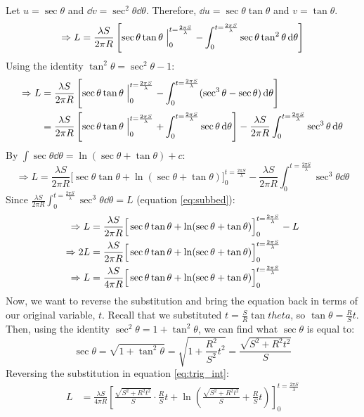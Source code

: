 \bulletarrow Let $u=\sec{\theta}$ and $\dd{v} = \sec^2{\theta} \dd{\theta}$. Therefore, $\dd{u} = \sec{\theta}\tan{\theta}$ and $v = \tan{\theta}$.
\begin{equation*}
    \Rightarrow L = \frac{\lambda S}{2\pi R}\left[\sec{\theta}\tan{\theta}\Bigm|_0^{t =\frac{2\pi S}{\lambda}}-\int_0^{t =\frac{2\pi S}{\lambda}} \sec{\theta}\tan^2{\theta} \dd{\theta}
    \right]
\end{equation*}
\bulletarrow Using the identity $\tan^2{\theta} = \sec^2{\theta} - 1$:
\begin{align*}
    \Rightarrow L & = \frac{\lambda S}{2\pi R}\left[\sec{\theta}\tan{\theta}\Bigm|_0^{t =\frac{2\pi S}{\lambda}}-\int_0^{t =\frac{2\pi S}{\lambda}} (\sec^3{\theta} - \sec{\theta}) \dd{\theta}\right]                                                                      \\
                  & = \frac{\lambda S}{2\pi R}\left[\sec{\theta}\tan{\theta}\Bigm|_0^{t =\frac{2\pi S}{\lambda}}+\int_0^{t =\frac{2\pi S}{\lambda}}  \sec{\theta} \dd{\theta}\right] - \frac{\lambda S}{2\pi R}\int_0^{t =\frac{2\pi S}{\lambda}}\sec^3{\theta} \dd{\theta}
\end{align*}
\bulletarrow By $\int \sec{\theta} \dd{\theta} = \ln(\sec{\theta}+\tan{\theta})+c$:
\begin{equation*}
    \Rightarrow L = \frac{\lambda S}{2\pi R}\Big[\sec{\theta}\tan{\theta}+\ln(\sec{\theta}+\tan{\theta})\Big]_0^{t =\frac{2\pi S}{\lambda}} - \frac{\lambda S}{2\pi R}\int_0^{t =\frac{2\pi S}{\lambda}}\sec^3{\theta} \dd{\theta}
\end{equation*}
\bulletarrow Since $\frac{\lambda S}{2\pi R}\int_0^{t =\frac{2\pi S}{\lambda}}\sec^3{\theta} \dd{\theta} = L$ (equation \ref{eq:subbed}):
\begin{align}
    \Rightarrow L  & = \frac{\lambda S}{2\pi R}\Big[\sec{\theta}\tan{\theta}+\ln(\sec{\theta}+\tan{\theta})\Big]_0^{t =\frac{2\pi S}{\lambda}} - L \notag           \\
    \Rightarrow 2L & = \frac{\lambda S}{2\pi R}\Big[\sec{\theta}\tan{\theta}+\ln(\sec{\theta}+\tan{\theta})\Big]_0^{t =\frac{2\pi S}{\lambda}} \notag               \\
    \Rightarrow L  & = \frac{\lambda S}{4\pi R}\Big[\sec {\theta}\tan{\theta}+\ln(\sec{\theta}+\tan{\theta})\Big]_0^{t =\frac{2\pi S}{\lambda}} \label{eq:trig_int}
\end{align}
\bulletarrow Now, we want to reverse the substitution and bring the equation back in terms of our original variable, $t$. Recall that we substituted $t=\frac{S}{R}\tan{theta}$, so $\tan{\theta} = \frac{R}{S}t$. Then, using the identity $\sec^2{\theta} = 1 + \tan^2{\theta}$, we can find what $\sec{\theta}$ is equal to:
\begin{equation*}
    \sec{\theta} = \sqrt{1+\tan^2{\theta}} =\sqrt{1+\frac{R^2}{S^2}t^2} = \frac{\sqrt{S^2+R^2t^2}}{S}
\end{equation*}
\bulletarrow Reversing the substitution in equation \ref{eq:trig_int}:
\begin{align*}
    L & = \frac{\lambda S}{4\pi R}\left[\frac{\sqrt{S^2+R^2t^2}}{S}\cdot\frac{R}{S}t+\ln\left(\frac{\sqrt{S^2+R^2t^2}}{S}+\frac{R}{S}t\right)\right]_0^{t =\frac{2\pi S}{\lambda}}
\end{align*}
